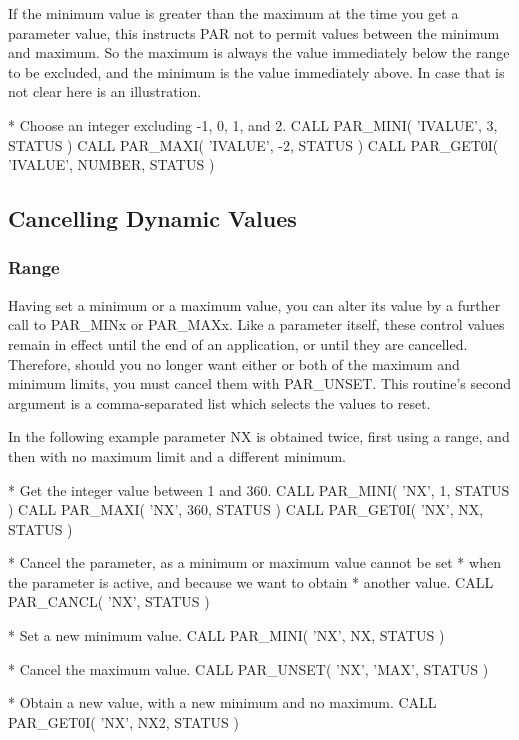 \documentclass[twoside,11pt,nolof]{starlink}
\begin{document}
If the minimum value is greater than the maximum at the time you
get a parameter value, this instructs PAR not to permit values between
the minimum and maximum.  So the maximum is always the value immediately
below the range to be excluded, and the minimum is the value immediately
above.  In case that is not clear here is an illustration.

\begin{terminalv}
*  Choose an integer excluding -1, 0, 1, and 2.
      CALL PAR_MINI( 'IVALUE', 3, STATUS )
      CALL PAR_MAXI( 'IVALUE', -2, STATUS )
      CALL PAR_GET0I( 'IVALUE', NUMBER, STATUS )
\end{terminalv}

\subsection{Cancelling Dynamic Values}

\subsubsection{Range}

Having set a minimum or a maximum value, you can alter its value by a
further call to PAR\_MINx or PAR\_MAXx.  Like a parameter itself, these
control values remain in effect until the end of an application, or
until they are cancelled.  Therefore, should you no longer want either
or both of the maximum and minimum limits, you must cancel them with
PAR\_UNSET.  This routine's second argument is a comma-separated list
which selects the values to reset.

In the following example parameter NX is obtained twice, first using a
range, and then with no maximum limit and a different minimum.

\begin{terminalv}
*  Get the integer value between 1 and 360.
      CALL PAR_MINI( 'NX', 1, STATUS )
      CALL PAR_MAXI( 'NX', 360, STATUS )
      CALL PAR_GET0I( 'NX', NX, STATUS )

*  Cancel the parameter, as a minimum or maximum value cannot be set
*  when the parameter is active, and because we want to obtain
*  another value.
      CALL PAR_CANCL( 'NX', STATUS )

*  Set a new minimum value.
      CALL PAR_MINI( 'NX', NX, STATUS )

*  Cancel the maximum value.
      CALL PAR_UNSET( 'NX', 'MAX', STATUS )

*  Obtain a new value, with a new minimum and no maximum.
      CALL PAR_GET0I( 'NX', NX2, STATUS )
\end{terminalv}
\end{document}
